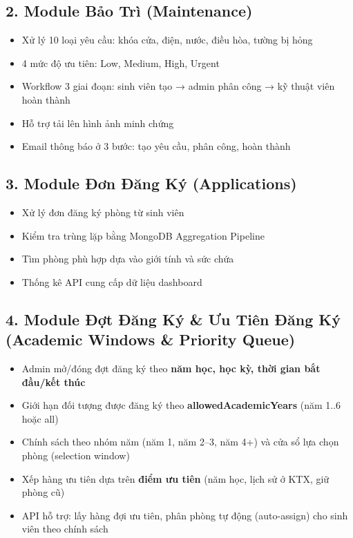 \documentclass[10pt,a4paper]{article}
\begin{document}
\subsection*{2. Module Bảo Trì (Maintenance)}
\begin{itemize}[nosep]
    \item Xử lý 10 loại yêu cầu: khóa cửa, điện, nước, điều hòa, tường bị hỏng
    \item 4 mức độ ưu tiên: Low, Medium, High, Urgent
    \item Workflow 3 giai đoạn: sinh viên tạo → admin phân công → kỹ thuật viên hoàn thành
    \item Hỗ trợ tải lên hình ảnh minh chứng
    \item Email thông báo ở 3 bước: tạo yêu cầu, phân công, hoàn thành
\end{itemize}

\subsection*{3. Module Đơn Đăng Ký (Applications)}
\begin{itemize}[nosep]
    \item Xử lý đơn đăng ký phòng từ sinh viên
    \item Kiểm tra trùng lặp bằng MongoDB Aggregation Pipeline
    \item Tìm phòng phù hợp dựa vào giới tính và sức chứa
    \item Thống kê API cung cấp dữ liệu dashboard
\end{itemize}

\subsection*{4. Module Đợt Đăng Ký \& Ưu Tiên Đăng Ký (Academic Windows \& Priority Queue)}
\begin{itemize}[nosep]
    \item Admin mở/đóng đợt đăng ký theo \t\textbf{năm học, học kỳ, thời gian bắt đầu/kết thúc}
    \item Giới hạn đối tượng được đăng ký theo \t\textbf{allowedAcademicYears} (năm 1..6 hoặc all)
    \item Chính sách theo nhóm năm (năm 1, năm 2--3, năm 4+) và cửa sổ lựa chọn phòng (selection window)
    \item Xếp hàng ưu tiên dựa trên \t\textbf{điểm ưu tiên} (năm học, lịch sử ở KTX, giữ phòng cũ)
    \item API hỗ trợ: lấy hàng đợi ưu tiên, phân phòng tự động (auto-assign) cho sinh viên theo chính sách
\end{itemize}
\end{document}
